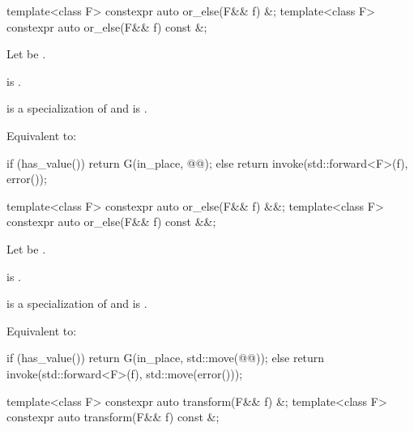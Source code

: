 %
\begin{itemdecl}
template<class F> constexpr auto or_else(F&& f) &;
template<class F> constexpr auto or_else(F&& f) const &;
\end{itemdecl}

\begin{itemdescr}
\pnum
Let  be .

\pnum
\constraints
{} is .

\pnum
\mandates
{} is a specialization of  and
 is .

\pnum
\effects
Equivalent to:
\begin{codeblock}
if (has_value())
  return G(in_place, @@);
else
  return invoke(std::forward<F>(f), error());
\end{codeblock}
\end{itemdescr}

%
\begin{itemdecl}
template<class F> constexpr auto or_else(F&& f) &&;
template<class F> constexpr auto or_else(F&& f) const &&;
\end{itemdecl}

\begin{itemdescr}
\pnum
Let  be
.

\pnum
\constraints
{} is .

\pnum
\mandates
{} is a specialization of  and
 is .

\pnum
\effects
Equivalent to:
\begin{codeblock}
if (has_value())
  return G(in_place, std::move(@@));
else
  return invoke(std::forward<F>(f), std::move(error()));
\end{codeblock}
\end{itemdescr}

%
\begin{itemdecl}
template<class F> constexpr auto transform(F&& f) &;
template<class F> constexpr auto transform(F&& f) const &;
\end{itemdecl}

